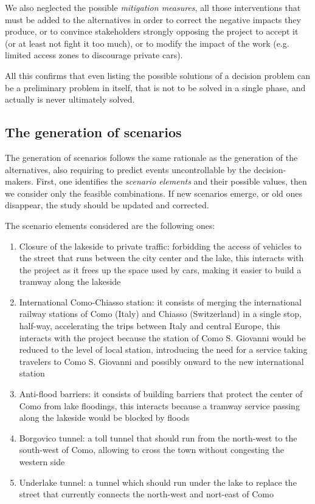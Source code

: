 We also neglected the possible \textit{mitigation measures}, all those interventions that must be added to the alternatives in order to correct the negative impacts they produce, or to convince stakeholders strongly opposing the project to accept it (or at least not fight it too much), or to modify the impact of the work (e.g. limited access zones to discourage private cars).

All this confirms that even listing the possible solutions of a decision problem can be a preliminary problem in itself, that is not to be solved in a single phase, and actually is never ultimately solved.

\subsection{The generation of scenarios}
\label{subsec:comoscenarios}

The generation of scenarios follows the same rationale as the generation of the alternatives, also requiring to predict events uncontrollable by the decision-makers. First, one identifies the \textit{scenario elements} and their possible values, then we consider only the feasible combinations. If new scenarios emerge, or old ones disappear, the study should be updated and corrected.

The scenario elements considered are the following ones: 
\begin{enumerate}
	\item Closure of the lakeside to private traffic: forbidding the access of vehicles to the street that runs between the city center and the lake, this interacts with the project as it frees up the space used by cars, making it easier to build a tramway along the lakeside
	
	\item International Como-Chiasso station: it consists of merging the international railway stations of Como (Italy) and Chiasso (Switzerland) in a single stop, half-way, accelerating the trips between Italy and central Europe, this interacts with the project because the station of Como S. Giovanni would be reduced to the level of local station, introducing the need for a service taking travelers to Como S. Giovanni and possibly onward to the new international station
	
	\item Anti-flood barriers: it consists of building barriers that protect the center of Como from lake floodings, this interacts because a tramway service passing along the lakeside would be blocked by floods
	
	\item Borgovico tunnel: a toll tunnel that should run from the north-west to the south-west of Como, allowing to cross the town without congesting the western side
	
	\item Underlake tunnel: a tunnel which should run under the lake to replace the street that currently connects the north-west and nort-east of Como
\end{enumerate}

